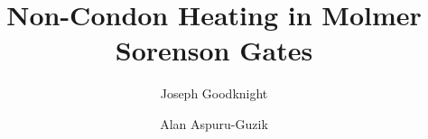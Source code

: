 



\title{Non-Condon Heating in Molmer Sorenson Gates}
\author{Joseph Goodknight}
\author{Alan Aspuru-Guzik}
\begin{abstract}
  
\end{abstract}

\maketitle








